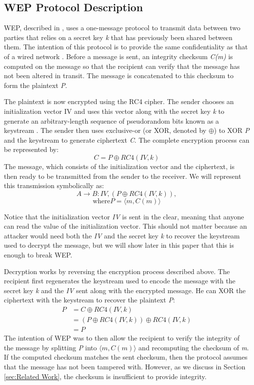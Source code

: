 \documentclass[11pt, twocolumn]{article} %
\begin{document}
\subsection{WEP Protocol Description}
\label{sec:WEP Desc}
WEP, described in \cite{borisov01}, uses a one-message protocol to transmit data between two parties that relies on a secret key \textit{k} that has previously been shared between them.  The intention of this protocol is to provide the same confidentiality as that of a wired network \cite{IEEE802.11}.  Before a message is sent, an integrity checksum \textit{C(m)} is computed on the message so that the recipient can verify that the message has not been altered in transit.  The message is concatenated to this checksum to form the plaintext \textit{P}.

The plaintext is now encrypted using the RC4 cipher.  The sender chooses an initialization vector IV and uses this vector along with the secret key \textit{k} to generate an arbitrary-length sequence of pseudorandom bits known as a keystream \cite{spore}.  The sender then uses exclusive-or (or XOR, denoted by $\oplus$) to XOR \textit{P} and the keystream to generate ciphertext \textit{C}.  The complete encryption process can be represented by: 
$$C = P \oplus RC4(IV, k)$$
The message, which consists of the initialization vector and the ciphertext, is then ready to be transmitted from the sender to the receiver.  We will represent this transmission symbolically as:
$$A \rightarrow B: IV, (P \oplus RC4(IV, k)),$$
$$ \text{where} P = \langle m, C(m) \rangle$$ 

Notice that the initialization vector \textit{IV} is sent in the clear, meaning that anyone can read the value of the initialization vector.  This should not matter because an attacker would need both the \textit{IV} and the secret key \textit{k} to recover the keystream used to decrypt the message, but we will show later in this paper that this is enough to break WEP.

Decryption works by reversing the encryption process described above.  The recipient first regenerates the keystream used to encode the message with the secret key \textit{k} and the \textit{IV} sent along with the encrypted message.  He can XOR the ciphertext with the keystream to recover the plaintext \textit{P}:
\begin{align*}
P &= C \oplus RC4(IV, k)\\
\nonumber &= (P \oplus RC4(IV, k)) \oplus RC4(IV, k)\\
\nonumber &= P
\end{align*}
The intention of WEP was to then allow the recipient to verify the integrity of the message by splitting \textit{P} into $\langle m, C(m) \rangle$ and recomputing the checksum of \textit{m}.  If the computed checksum matches the sent checksum, then the protocol assumes that the message has not been tampered with.   However, as we discuss in Section \ref{sec:Related Work}, the checksum is insufficient to provide integrity. 
\end{document}
